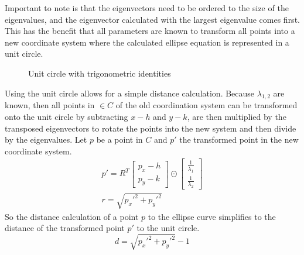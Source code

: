 Important to note is that the eigenvectors need to be ordered to the size of the eigenvalues, and the eigenvector calculated with the largest eigenvalue comes first. This has the benefit that all parameters are known to transform all points into a new coordinate system where the calculated ellipse equation is represented in a unit circle.


\begin{figure}[h]
    \centering
    \caption{Unit circle with trigonometric identities}
    \label{fig:unit_circle}
\end{figure}

Using the unit circle allows for a simple distance calculation. Because $\lambda_{1,2}$ are known, then all points in $\in C$ of the old coordination system can be transformed onto the unit circle by subtracting $x-h$ and $y-k$, are then multiplied by the transposed eigenvectors to rotate the points into the new system and then divide by the eigenvalues. Let $p$ be a point in $C$ and $p'$ the transformed point in the new coordinate system. 
\begin{align}
    p' = R^T \begin{bmatrix} p_x - h \\ p_y - k \end{bmatrix} \odot \begin{bmatrix} \frac{1}{\lambda_1} \\ \frac{1}{\lambda_2} \end{bmatrix}\\
    r = \sqrt{p_x'^2 + p_y'^2}
    \label{distance calculation}
\end{align}
So the distance calculation of a point $p$ to the ellipse curve simplifies to the distance of the transformed point $p'$ to the unit circle.
\begin{equation}
    d = \sqrt{p_x'^2 + p_y'^2} -1
\end{equation}

